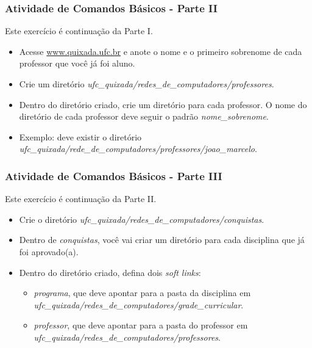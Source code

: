 \documentclass{beamer}
\begin{document}
   \begin{frame}
      \frametitle{Atividade de Comandos Básicos - Parte II}
      Este exercício é continuação da Parte I.
      \begin{itemize}
         \item Acesse \url{www.quixada.ufc.br} e anote o nome e o primeiro sobrenome de cada professor que você já foi aluno.
         \item Crie um diretório \textit{ufc\_quixada/redes\_de\_computadores/professores}.
         \item Dentro do diretório criado, crie um diretório para cada professor. O nome do diretório de cada professor deve seguir o padrão \textit{nome\_sobrenome}. 
         \item Exemplo: deve existir o diretório \textit{ufc\_quixada/rede\_de\_computadores/professores/joao\_marcelo}.
      \end{itemize}
   \end{frame}

   \begin{frame}
      \frametitle{Atividade de Comandos Básicos - Parte III}
      Este exercício é continuação da Parte II.
      \begin{itemize}
         \item Crie o diretório \textit{ufc\_quixada/redes\_de\_computadores/conquistas}.
	 \item Dentro de \textit{conquistas}, você vai criar um diretório para cada disciplina que já foi aprovado(a).
         \item Dentro do diretório criado, defina dois \textit{soft links}:
	 \begin{itemize}
	    \item \textit{programa}, que deve apontar para a pasta da disciplina em \textit{ufc\_quixada/redes\_de\_computadores/grade\_curricular}.
	    \item \textit{professor}, que deve apontar para a pasta do professor em \textit{ufc\_quixada/redes\_de\_computadores/professores}.
	 \end{itemize}
      \end{itemize}
   \end{frame}
\end{document}
